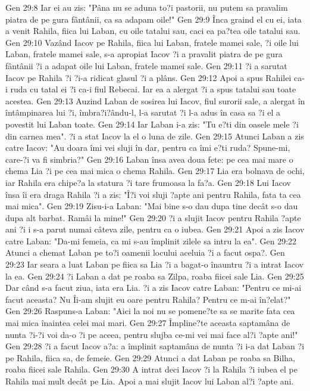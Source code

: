 Gen 29:8  Iar ei au zis: "Pâna nu se aduna to?i pastorii, nu putem sa pravalim piatra de pe gura fântânii, ca sa adapam oile!"
Gen 29:9  Înca graind el cu ei, iata a venit Rahila, fiica lui Laban, cu oile tatalui sau, caci ea pa?tea oile tatalui sau.
Gen 29:10  Vazând Iacov pe Rahila, fiica lui Laban, fratele mamei sale, ?i oile lui Laban, fratele mamei sale, s-a apropiat Iacov ?i a pravalit piatra de pe gura fântânii ?i a adapat oile lui Laban, fratele mamei sale.
Gen 29:11  ?i a sarutat Iacov pe Rahila ?i ?i-a ridicat glasul ?i a plâns.
Gen 29:12  Apoi a spus Rahilei ca-i ruda cu tatal ei ?i ca-i fiul Rebecai. Iar ea a alergat ?i a spus tatalui sau toate acestea.
Gen 29:13  Auzind Laban de sosirea lui Iacov, fiul surorii sale, a alergat în întâmpinarea lui ?i, îmbra?i?ându-l, l-a sarutat ?i l-a adus în casa sa ?i el a povestit lui Laban toate.
Gen 29:14  Iar Laban i-a zis: "Tu e?ti din oasele mele ?i din carnea mea". ?i a stat Iacov la el o luna de zile.
Gen 29:15  Atunci Laban a zis catre Iacov: "Au doara îmi vei sluji în dar, pentru ca îmi e?ti ruda? Spune-mi, care-?i va fi simbria?"
Gen 29:16  Laban însa avea doua fete: pe cea mai mare o chema Lia ?i pe cea mai mica o chema Rahila.
Gen 29:17  Lia era bolnava de ochi, iar Rahila era chipe?a la statura ?i tare frumoasa la fa?a.
Gen 29:18  Lui Iacov însa îi era draga Rahila ?i a zis: "Î?i voi sluji ?apte ani pentru Rahila, fata ta cea mai mica".
Gen 29:19  Zisu-i-a Laban: "Mai bine s-o dau dupa tine decât s-o dau dupa alt barbat. Ramâi la mine!"
Gen 29:20  ?i a slujit Iacov pentru Rahila ?apte ani ?i i s-a parut numai câteva zile, pentru ca o iubea.
Gen 29:21  Apoi a zis Iacov catre Laban: "Da-mi femeia, ca mi s-au împlinit zilele sa intru la ea".
Gen 29:22  Atunci a chemat Laban pe to?i oamenii locului aceluia ?i a facut ospa?.
Gen 29:23  Iar seara a luat Laban pe fiica sa Lia ?i a bagat-o înauntru ?i a intrat Iacov la ea.
Gen 29:24  ?i Laban a dat pe roaba sa Zilpa, roaba fiicei sale Lia.
Gen 29:25  Dar când s-a facut ziua, iata era Lia. ?i a zis Iacov catre Laban: "Pentru ce mi-ai facut aceasta? Nu Îi-am slujit eu oare pentru Rahila? Pentru ce m-ai în?elat?"
Gen 29:26  Raspuns-a Laban: "Aici la noi nu se pomene?te sa se marite fata cea mai mica înaintea celei mai mari.
Gen 29:27  Împline?te aceasta saptamâna de nunta ?i-?i voi da-o ?i pe aceea, pentru slujba ce-mi vei mai face al?i ?apte ani!"
Gen 29:28  ?i a facut Iacov a?a: a împlinit saptamâna de nunta ?i i-a dat Laban ?i pe Rahila, fiica sa, de femeie.
Gen 29:29  Atunci a dat Laban pe roaba sa Bilha, roaba fiicei sale Rahila.
Gen 29:30  A intrat deci Iacov ?i la Rahila ?i iubea el pe Rahila mai mult decât pe Lia. Apoi a mai slujit Iacov lui Laban al?i ?apte ani.
